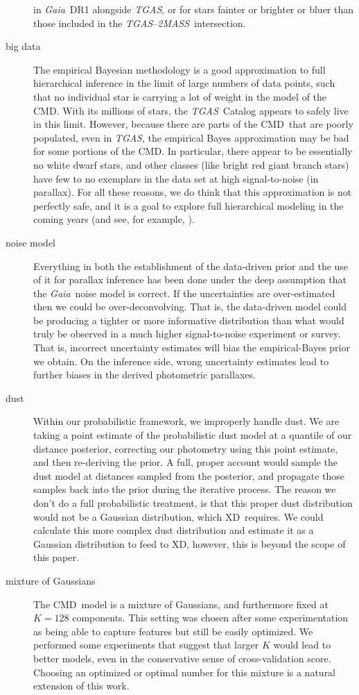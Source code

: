 \documentclass[modern]{aastex61}
\newcommand{\acronym}[1]{{\small{#1}}}
\newcommand{\project}[1]{\textsl{#1}}
\newcommand{\tgas}{\project{\acronym{TGAS}}}
\newcommand{\tmass}{\project{\acronym{2MASS}}}
\newcommand{\gaia}{\project{Gaia}}
\newcommand{\xd}{\acronym{XD}}
\newcommand{\cmd}{\acronym{CMD}}
\begin{document}
\begin{description}
  in \gaia\ DR1 alongside \tgas, or for stars fainter or brighter or
  bluer than those included in the \tgas--\tmass\ intersection.
\item[big data] The empirical Bayesian methodology is a good
  approximation to full hierarchical inference in the limit of large
  numbers of data points, such that no individual star is carrying a
  lot of weight in the model of the \cmd.  With its millions of stars,
  the \tgas\ Catalog appears to safely live in this limit.  However,
  because there are parts of the \cmd\ that are poorly populated, even
  in \tgas, the empirical Bayes approximation may be bad for some
  portions of the \cmd.  In particular, there appear to be essentially
  no white dwarf stars, and other classes (like bright red giant
  branch stars) have few to no exemplars in the data set at high
  signal-to-noise (in parallax).  For all these reasons, we do think
  that this approximation is not perfectly safe, and it is a goal to
  explore full hierarchical modeling in the coming years (and see, for
  example, \citealt{leistedtHogg2017}).
\item[noise model] Everything in both the establishment of the data-driven
  prior and the use of it for parallax inference has been done under the deep
  assumption that the \gaia\ noise model is correct. If the
  uncertainties are over-estimated then we could be over-deconvolving.
  That is, the data-driven model could be producing a tighter or more
  informative distribution than what would truly be observed in a much
  higher signal-to-noise experiment or survey. That is, incorrect uncertainty
  estimates will bias the empirical-Bayes prior we obtain. On the inference
  side, wrong uncertainty estimates lead to further biases in the derived photometric parallaxes.
\item[dust] Within our probabilistic framework, we improperly handle
  dust. We are taking a point estimate of the probabilistic dust model
  at a quantile of our distance posterior, correcting our photometry
  using this point estimate, and then re-deriving the prior. A full,
  proper account would sample the dust model at distances sampled from
  the posterior, and propagate those samples back into the prior
  during the iterative process. The reason we don't do a full
  probabilistic treatment, is that this proper dust distribution would
  not be a Gaussian distribution, which \xd\ requires. We could
  calculate this more complex dust distribution and estimate it as a
  Gaussian distribution to feed to \xd, however, this is beyond the
  scope of this paper.
\item[mixture of Gaussians] The \cmd\ model is a mixture of Gaussians,
  and furthermore fixed at $K=128$ components. This setting was chosen
  after some experimentation as being able to capture features but still
  be easily optimized. We performed some experiments
  that suggest that larger $K$ would lead to better models, even in the
  conservative sense of cross-validation score. Choosing an optimized or
  optimal number for this mixture is a natural extension of this work.


\end{description}
\end{document}
